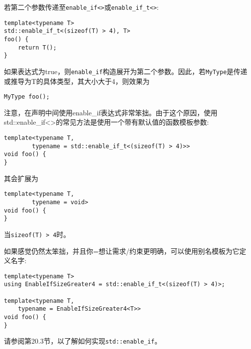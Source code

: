 若第二个参数传递至\texttt{enable\_if<>}或\texttt{enable\_if\_t<>}:

\begin{lstlisting}[style=styleCXX]
template<typename T>
std::enable_if_t<(sizeof(T) > 4), T>
foo() {
	return T();
}
\end{lstlisting}

如果表达式为true，则\texttt{enable\_if}构造展开为第二个参数。因此，若\texttt{MyType}是传递或推导为T的具体类型，其大小大于4，则效果为

\begin{lstlisting}[style=styleCXX]
MyType foo();
\end{lstlisting}

注意，在声明中间使用enable\_if表达式非常笨拙。由于这个原因，使用std::enable\_if<>的常见方法是使用一个带有默认值的函数模板参数: 

\begin{lstlisting}[style=styleCXX]
template<typename T,
		typename = std::enable_if_t<(sizeof(T) > 4)>>
void foo() {
}
\end{lstlisting}

其会扩展为

\begin{lstlisting}[style=styleCXX]
template<typename T,
		typename = void>
void foo() {
}
\end{lstlisting}

当\texttt{sizeof(T) > 4}时。

如果感觉仍然太笨拙，并且你=想让需求/约束更明确，可以使用别名模板为它定义名字:

\begin{lstlisting}[style=styleCXX]
template<typename T>
using EnableIfSizeGreater4 = std::enable_if_t<(sizeof(T) > 4)>;

template<typename T,
	typename = EnableIfSizeGreater4<T>>
void foo() {
}
\end{lstlisting}

请参阅第20.3节，以了解如何实现\texttt{std::enable\_if}。










